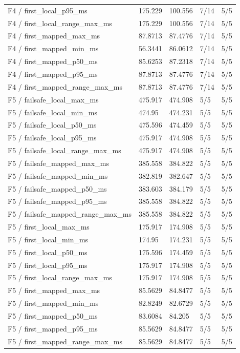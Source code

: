 \begin{tabular}{@{}lllll@{}}
F4 / first\_local\_p95\_ms & 175.229 & 100.556 & 7/14 & 5/5 \\
F4 / first\_local\_range\_max\_ms & 175.229 & 100.556 & 7/14 & 5/5 \\
F4 / first\_mapped\_max\_ms & 87.8713 & 87.4776 & 7/14 & 5/5 \\
F4 / first\_mapped\_min\_ms & 56.3441 & 86.0612 & 7/14 & 5/5 \\
F4 / first\_mapped\_p50\_ms & 85.6253 & 87.2318 & 7/14 & 5/5 \\
F4 / first\_mapped\_p95\_ms & 87.8713 & 87.4776 & 7/14 & 5/5 \\
F4 / first\_mapped\_range\_max\_ms & 87.8713 & 87.4776 & 7/14 & 5/5 \\
F5 / failsafe\_local\_max\_ms & 475.917 & 474.908 & 5/5 & 5/5 \\
F5 / failsafe\_local\_min\_ms & 474.95 & 474.231 & 5/5 & 5/5 \\
F5 / failsafe\_local\_p50\_ms & 475.596 & 474.459 & 5/5 & 5/5 \\
F5 / failsafe\_local\_p95\_ms & 475.917 & 474.908 & 5/5 & 5/5 \\
F5 / failsafe\_local\_range\_max\_ms & 475.917 & 474.908 & 5/5 & 5/5 \\
F5 / failsafe\_mapped\_max\_ms & 385.558 & 384.822 & 5/5 & 5/5 \\
F5 / failsafe\_mapped\_min\_ms & 382.819 & 382.647 & 5/5 & 5/5 \\
F5 / failsafe\_mapped\_p50\_ms & 383.603 & 384.179 & 5/5 & 5/5 \\
F5 / failsafe\_mapped\_p95\_ms & 385.558 & 384.822 & 5/5 & 5/5 \\
F5 / failsafe\_mapped\_range\_max\_ms & 385.558 & 384.822 & 5/5 & 5/5 \\
F5 / first\_local\_max\_ms & 175.917 & 174.908 & 5/5 & 5/5 \\
F5 / first\_local\_min\_ms & 174.95 & 174.231 & 5/5 & 5/5 \\
F5 / first\_local\_p50\_ms & 175.596 & 174.459 & 5/5 & 5/5 \\
F5 / first\_local\_p95\_ms & 175.917 & 174.908 & 5/5 & 5/5 \\
F5 / first\_local\_range\_max\_ms & 175.917 & 174.908 & 5/5 & 5/5 \\
F5 / first\_mapped\_max\_ms & 85.5629 & 84.8477 & 5/5 & 5/5 \\
F5 / first\_mapped\_min\_ms & 82.8249 & 82.6729 & 5/5 & 5/5 \\
F5 / first\_mapped\_p50\_ms & 83.6084 & 84.205 & 5/5 & 5/5 \\
F5 / first\_mapped\_p95\_ms & 85.5629 & 84.8477 & 5/5 & 5/5 \\
F5 / first\_mapped\_range\_max\_ms & 85.5629 & 84.8477 & 5/5 & 5/5 \\
\bottomrule
\end{tabular}

